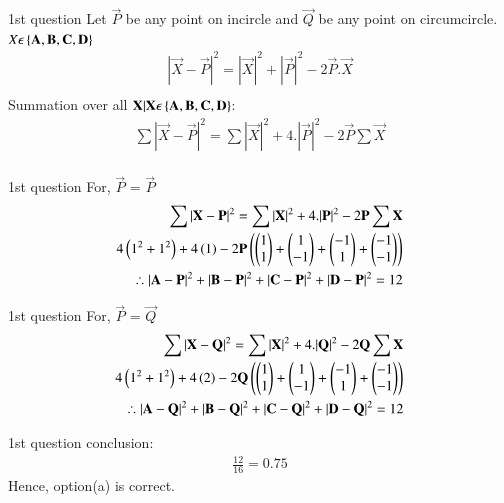 \documentclass{beamer}
\begin{document}
\begin{frame}{1st question}
Let $\vec{P}$ be any point on incircle and $\vec{Q}$ be any point on circumcircle.\\
$X\epsilon \left\{\mathbf{A,B,C,D}\right\}$
\begin{align}
    |\vec{X}-\vec{P}|^2 = |\vec{X}|^2 + |\vec{P}|^2 - 2\vec{P}.\vec{X}\\
\end{align}
Summation over all $\mathbf{X}|\mathbf{X}\epsilon \left\{\mathbf{A,B,C,D}\right\}$:
\begin{align}
    \sum |\vec{X}-\vec{P}|^2 = \sum |\vec{X}|^2 + 4.|\vec{P}|^2 -2\vec{P}\sum \vec{X}\\
\end{align}
\end{frame}

\begin{frame}{1st question}
For, $\vec{P}$ = $\vec{P}$
\begin{align}
    \sum |\mathbf{X}-\mathbf{P}|^2 = \sum |\mathbf{X}|^2 + 4.|\mathbf{P}|^2 -2\mathbf{P}\sum \mathbf{X}\\
    4\left(1^2+1^2\right) + 4\left(1\right)-2\mathbf{P}\left(\begin{pmatrix}1\\1\end{pmatrix}+\begin{pmatrix}1\\-1\end{pmatrix}+\begin{pmatrix}-1\\1\end{pmatrix}+\begin{pmatrix}-1\\-1\end{pmatrix}\right)\\
    \therefore |\mathbf{A}-\mathbf{P}|^2+|\mathbf{B}-\mathbf{P}|^2+|\mathbf{C}-\mathbf{P}|^2+|\mathbf{D}-\mathbf{P}|^2 = 12
\end{align}
\end{frame}

\begin{frame}{1st question}
    For, $\vec{P}$ = $\vec{Q}$
\begin{align}
    \sum |\mathbf{X}-\mathbf{Q}|^2 = \sum |\mathbf{X}|^2 + 4.|\mathbf{Q}|^2 -2\mathbf{Q}\sum \mathbf{X}\\
    4\left(1^2+1^2\right) + 4\left(2\right)-2\mathbf{Q}\left(\begin{pmatrix}1\\1\end{pmatrix}+\begin{pmatrix}1\\-1\end{pmatrix}+\begin{pmatrix}-1\\1\end{pmatrix}+\begin{pmatrix}-1\\-1\end{pmatrix}\right)\\
    \therefore |\mathbf{A}-\mathbf{Q}|^2+|\mathbf{B}-\mathbf{Q}|^2+|\mathbf{C}-\mathbf{Q}|^2+|\mathbf{D}-\mathbf{Q}|^2 = 12
\end{align}
\end{frame}

\begin{frame}{1st question}
    conclusion:
\begin{align}
    \frac{12}{16}=0.75
\end{align}
Hence, option(a) is correct.
\end{frame}
\end{document}
